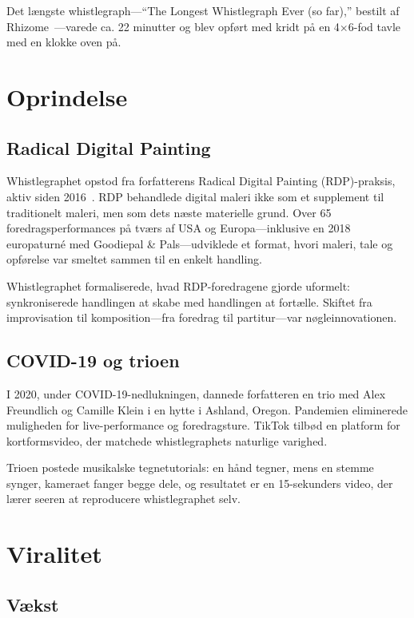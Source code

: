 \documentclass[10pt,letterpaper,twocolumn]{article}
\begin{document}
Det længste whistlegraph---``The Longest Whistlegraph Ever (so far),'' bestilt af Rhizome~\citep{rhizome2022longest}---varede ca. 22 minutter og blev opført med kridt på en 4$\times$6-fod tavle med en klokke oven på.

\section{Oprindelse}

\subsection{Radical Digital Painting}

Whistlegraphet opstod fra forfatterens Radical Digital Painting (RDP)-praksis, aktiv siden 2016~\citep{scudder2017manifesto}. RDP behandlede digital maleri ikke som et supplement til traditionelt maleri, men som dets næste materielle grund. Over 65 foredragsperformances på tværs af USA og Europa---inklusive en 2018 europaturné med Goodiepal \& Pals---udviklede et format, hvori maleri, tale og opførelse var smeltet sammen til en enkelt handling.

Whistlegraphet formaliserede, hvad RDP-foredragene gjorde uformelt: synkroniserede handlingen at skabe med handlingen at fortælle. Skiftet fra improvisation til komposition---fra foredrag til partitur---var nøgleinnovationen.

\subsection{COVID-19 og trioen}

I 2020, under COVID-19-nedlukningen, dannede forfatteren en trio med Alex Freundlich og Camille Klein i en hytte i Ashland, Oregon. Pandemien eliminerede muligheden for live-performance og foredragsture. TikTok tilbød en platform for kortformsvideo, der matchede whistlegraphets naturlige varighed.

Trioen postede musikalske tegnetutorials: en hånd tegner, mens en stemme synger, kameraet fanger begge dele, og resultatet er en 15-sekunders video, der lærer seeren at reproducere whistlegraphet selv.

\section{Viralitet}

\subsection{Vækst}
\end{document}
